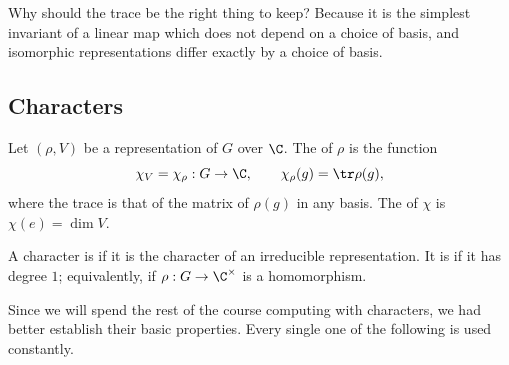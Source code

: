 Why should the trace be the right thing to keep? Because it is the simplest invariant of a linear map which does not depend on a choice of basis, and isomorphic representations differ exactly by a choice of basis.

\subsection{Characters}

\begin{definition}[Character]
	Let $(\rho, V)$ be a representation of $G$ over $\C$. The  of $\rho$ is the function
	$$\chi_V = \chi_\rho : G \to \C, \qquad \chi_\rho(g) = \tr \rho(g),$$
	where the trace is that of the matrix of $\rho(g)$ in any basis. The  of $\chi$ is $\chi(e) = \dim V$.
\end{definition}

\begin{definition}
	A character is  if it is the character of an irreducible representation. It is  if it has degree $1$; equivalently, if $\rho : G \to \C^\times$ is a homomorphism.
\end{definition}

Since we will spend the rest of the course computing with characters, we had better establish their basic properties. Every single one of the following is used constantly.

